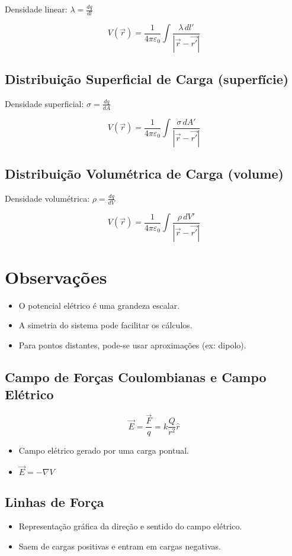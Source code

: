 \documentclass[a4paper,12pt]{article}
\begin{document}
\begin{multicols}{2}
Densidade linear: \( \lambda = \frac{dq}{dl} \)

\[
V(\vec{r}) = \frac{1}{4\pi \varepsilon_0} \int \frac{\lambda \, dl'}{|\vec{r} - \vec{r'}|}
\]

\subsection{Distribuição Superficial de Carga (superfície)}

Densidade superficial: \( \sigma = \frac{dq}{dA} \)

\[
V(\vec{r}) = \frac{1}{4\pi \varepsilon_0} \int \frac{\sigma \, dA'}{|\vec{r} - \vec{r'}|}
\]

\subsection{Distribuição Volumétrica de Carga (volume)}

Densidade volumétrica: \( \rho = \frac{dq}{dV} \)

\[
V(\vec{r}) = \frac{1}{4\pi \varepsilon_0} \int \frac{\rho \, dV'}{|\vec{r} - \vec{r'}|}
\]

\section{Observações}

\begin{itemize}
  \item O potencial elétrico é uma grandeza escalar.
  \item A simetria do sistema pode facilitar os cálculos.
  \item Para pontos distantes, pode-se usar aproximações (ex: dipolo).
\end{itemize}

\subsection{Campo de Forças Coulombianas e Campo Elétrico}
\begin{equation}
    \vec{E} = \frac{\vec{F}}{q} = k \frac{Q}{r^2} \hat{r}
\end{equation}
\begin{itemize}
    \item Campo elétrico gerado por uma carga pontual.
    \item $\vec{E} = - \nabla V$
\end{itemize}

\subsection{Linhas de Força}
\begin{itemize}
    \item Representação gráfica da direção e sentido do campo elétrico.
    \item Saem de cargas positivas e entram em cargas negativas.
\end{itemize}


\end{multicols}
\end{document}
